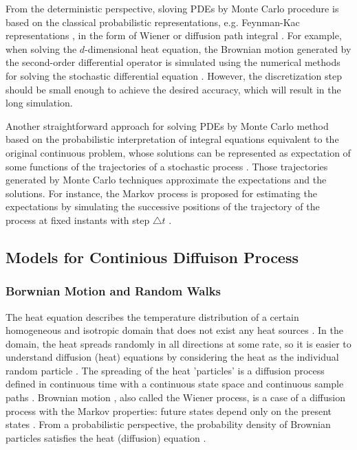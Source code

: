 From the deterministic perspective, sloving PDEs by Monte Carlo
procedure is based on the classical probabilistic representations,
e.g. Feynman-Kac representations \cite{kac1987enigmas}, in the form of
Wiener or diffusion path integral \cite{sabelfeld2013random}. For
example, when solving the $d$-dimensional heat equation, the Brownian
motion generated by the second-order differential operator is
simulated using the numerical methods for solving the stochastic
differential equation \cite{wiki:MCMheat}. However, the discretization
step should be small enough to achieve the desired accuracy, which
will result in the long simulation.

Another straightforward approach for solving PDEs by Monte Carlo
method based on the probabilistic interpretation of integral equations
equivalent to the original continuous problem, whose solutions can be
represented as expectation of some functions of the trajectories of a
stochastic process
\cite{varadhan1980lectures}\cite{grebenkov2014efficient}\cite{sabelfeld2013random}.
Those trajectories generated by Monte Carlo techniques approximate the
expectations and the solutions. For instance, the Markov process is
proposed for estimating the expectations by simulating the successive
positions of the trajectory of the process at fixed instants with step
$\triangle t$ \cite{kronberg1976solution}\cite{king1951monte}.



\subsection{Models for Continious Diffuison Process}


\subsubsection{Borwnian Motion and Random Walks}

The heat equation describes the temperature distribution of a certain
homogeneous and isotropic domain that does not exist any heat sources
\cite{varadhan1980lectures}. In the domain, the heat spreads randomly
in all directions at some rate, so it is easier to understand
diffusion (heat) equations by considering the heat as the individual
random particle \cite{lawler2010random}. The spreading of the heat
'particles' is a diffusion process defined in continuous time with a
continuous state space and continuous sample paths
\cite{ito2012diffusion}. Brownian motion
\cite{brown1828microscopical}, also called the Wiener process, is a
case of a diffusion process with the Markov properties: future states
depend only on the present states \cite{bharucha2012elements}. From a
probabilistic perspective, the probability density of Brownian
particles satisfies the heat (diffusion) equation
\cite{kac1947random}\cite{varadhan1980lectures}.




